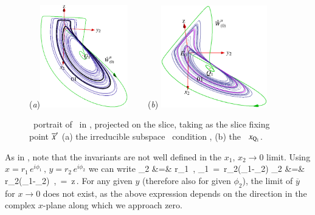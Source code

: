 \documentclass[preprint,number,sort&compress]{elsarticle}
\begin{document}
%
\begin{figure}[ht]
\begin{center}
  (\textit{a})\includegraphics[width=0.34\textwidth,clip=true]{CLEcoord245}
 ~~~~(\textit{b})%
\includegraphics[width=0.41\textwidth,clip=true]{CLEperpReqb}
\end{center}
\caption{
\Statesp\ portrait of \cLf\ in \reducedsp, projected on the
slice, taking as the slice fixing point ${\overline{x}'}$
(a) the irreducible subspace \slice\ condition ,
(b) the \reqv\ $x_{\mathrm{Q}_{1}}$.
}
\label{fig:CLEmf}
\end{figure}


As in , note that the in\-vari\-ants
are not well defined in the $x_1,\,x_2 \to 0$ limit.
Using $x=r_1\, e^{i\phi_1}\,,\, y=r_2\, e^{i\phi_2}$ we can write
\bea
	  _2 &=& r_1 \,,\qquad
	  _1 \,=\, r_2\sin(\phi_1-\phi_2)\continue
	  _2 &=& r_2\cos(\phi_1-\phi_2) \,,\qquad	
	   \,=\, z\,.
	  \label{eq:invLaserPolar}
\eea
For any given $y$ (therefore also for given $\phi_2$), the
limit of $\overline{y}$ for $x \rightarrow 0$ does not exist,
as the above expression depends on the direction in the
complex $x$-plane along which we approach zero.
\end{document}
